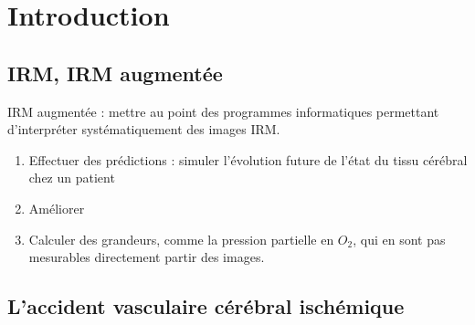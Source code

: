 \section{Introduction}

\subsection{IRM, IRM augment\'ee}%



IRM augment\'ee : mettre au point des programmes informatiques permettant d'interpr\'eter syst\'ematiquement des images IRM.
\begin{enumerate}
\item Effectuer des pr\'edictions : simuler l'\'evolution future de l'\'etat du tissu c\'er\'ebral chez un patient%

\item Am\'eliorer 
\item Calculer des grandeurs, comme la pression partielle en $O_2$, qui en sont pas mesurables directement  partir des images.
\end{enumerate}






\subsection{L'accident vasculaire c\'er\'ebral isch\'emique}









